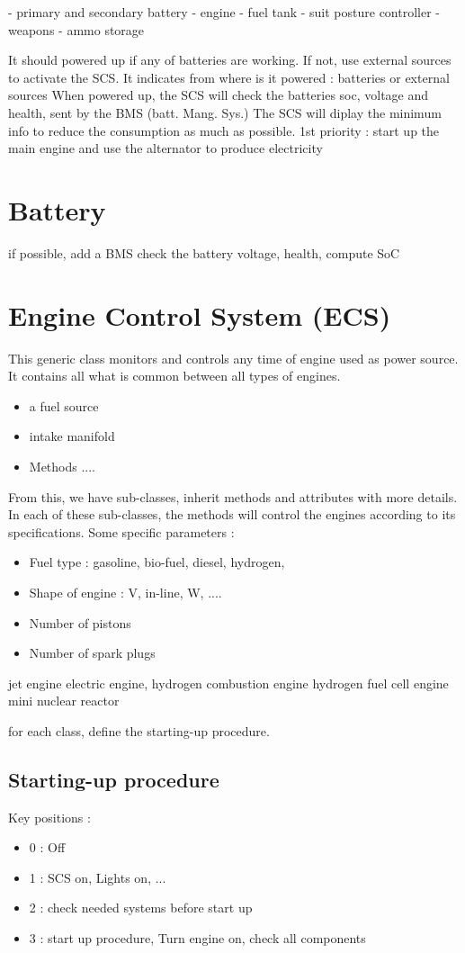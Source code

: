 \documentclass[12pt,a4paper]{article}
\begin{document}
- primary and secondary battery
- engine
- fuel tank
- suit posture controller
- weapons
- ammo storage

It should powered up if any of batteries are working. 
If not, use external sources to activate the SCS. It indicates from where is it powered : batteries or external sources
When powered up, the SCS will check the batteries soc, voltage and health, sent by the BMS (batt. Mang. Sys.) 
The SCS will diplay the minimum info to reduce the consumption as much as possible.
1st priority : start up the main engine and use the alternator to produce electricity

\section{Battery}
if possible, add a BMS
check the battery voltage, health, compute SoC

\section{Engine Control System (ECS)}
This generic class monitors and controls any time of engine used as power source. It contains all what is common between all types of engines. 
\begin{itemize}
	\item a fuel source
	\item intake manifold 
	\item Methods ....
\end{itemize}
From this, we have sub-classes, inherit methods and attributes with more details. In each of these sub-classes, the methods will control the engines according to its specifications. 
Some specific parameters :

\begin{itemize}
	\item Fuel type : gasoline, bio-fuel, diesel, hydrogen, 
	\item Shape of engine : V, in-line, W, ....
	\item Number of pistons
	\item Number of spark plugs
\end{itemize}


jet engine
electric engine,
hydrogen combustion engine
hydrogen fuel cell engine
mini nuclear reactor

for each class, define the starting-up procedure. 
\subsection{Starting-up procedure}
Key positions : 
\begin{itemize}
	\item 0 : Off
	\item 1 : SCS on, Lights on, ...
	\item 2 : check needed systems before start up
	\item 3 : start up procedure, Turn engine on, check all components
\end{itemize}
\end{document}

